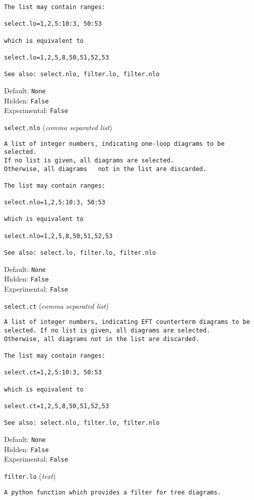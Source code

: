 \begin{basedescript}{\desclabelstyle{\pushlabel}}
\begin{verbatim}
The list may contain ranges:

select.lo=1,2,5:10:3, 50:53

which is equivalent to

select.lo=1,2,5,8,50,51,52,53

See also: select.nlo, filter.lo, filter.nlo
\end{verbatim}
Default: \verb|None|
\\Hidden: \verb|False|
\\Experimental: \verb|False|
\\\item[\colorbox{gray!30}{\texttt{select.nlo}}] (\textit{comma separated list})
\begin{verbatim}
A list of integer numbers, indicating one-loop diagrams to be selected.
If no list is given, all diagrams are selected.
Otherwise, all diagrams   not in the list are discarded.

The list may contain ranges:

select.nlo=1,2,5:10:3, 50:53

which is equivalent to

select.nlo=1,2,5,8,50,51,52,53

See also: select.lo, filter.lo, filter.nlo
\end{verbatim}
Default: \verb|None|
\\Hidden: \verb|False|
\\Experimental: \verb|False|
\\\item[\colorbox{gray!30}{\texttt{select.ct}}] (\textit{comma separated list})
\begin{verbatim}
A list of integer numbers, indicating EFT counterterm diagrams to be
selected. If no list is given, all diagrams are selected.
Otherwise, all diagrams not in the list are discarded.

The list may contain ranges:

select.ct=1,2,5:10:3, 50:53

which is equivalent to

select.ct=1,2,5,8,50,51,52,53

See also: select.nlo, filter.lo, filter.nlo
\end{verbatim}
Default: \verb|None|
\\Hidden: \verb|False|
\\Experimental: \verb|False|
\\\item[\colorbox{gray!30}{\texttt{filter.lo}}] (\textit{text})
\begin{verbatim}
A python function which provides a filter for tree diagrams.


\end{verbatim}
\end{basedescript}
